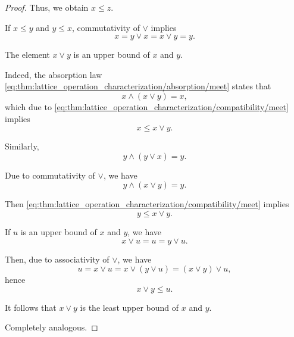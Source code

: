 \begin{proof}
  Thus, we obtain \( x \leq z \).

   If \( x \leq y \) and \( y \leq x \), commutativity of \( \vee \) implies
  \begin{equation*}
    x = y \vee x = x \vee y = y.
  \end{equation*}

   The element \( x \vee y \) is an upper bound of \( x \) and \( y \).

  Indeed, the absorption law \eqref{eq:thm:lattice_operation_characterization/absorption/meet} states that
  \begin{equation*}
    x \wedge (x \vee y) = x,
  \end{equation*}
  which due to \eqref{eq:thm:lattice_operation_characterization/compatibility/meet} implies
  \begin{equation*}
    x \leq x \vee y.
  \end{equation*}

  Similarly,
  \begin{equation*}
    y \wedge (y \vee x) = y.
  \end{equation*}

  Due to commutativity of \( \vee \), we have
  \begin{equation*}
    y \wedge (x \vee y) = y.
  \end{equation*}

  Then \eqref{eq:thm:lattice_operation_characterization/compatibility/meet} implies
  \begin{equation*}
    y \leq x \vee y.
  \end{equation*}

  If \( u \) is an upper bound of \( x \) and \( y \), we have
  \begin{equation*}
    x \vee u = u = y \vee u.
  \end{equation*}

  Then, due to associativity of \( \vee \), we have
  \begin{equation*}
    u = x \vee u = x \vee (y \vee u) = (x \vee y) \vee u,
  \end{equation*}
  hence
  \begin{equation*}
    x \vee y \leq u.
  \end{equation*}

  It follows that \( x \vee y \) is the least upper bound of \( x \) and \( y \).

   Completely analogous.
\end{proof}

